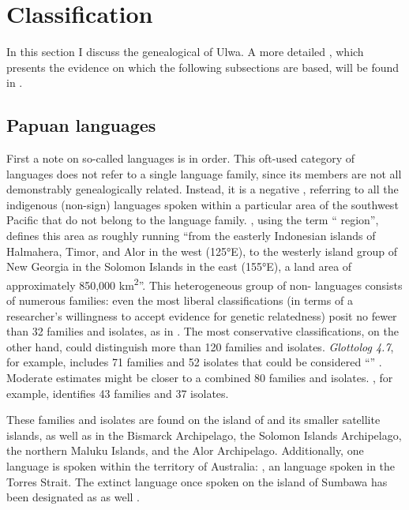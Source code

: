 
\section{Classification}\label{sec:1.7}


In this section I discuss the genealogical  of Ulwa. A more detailed , which presents the evidence on which the following subsections are based, will be found in \citet{UsherBarlow}.

\subsection{Papuan languages}\label{sec:1.7.1}

First a note on so-called  languages is in order. This oft-used category of languages does not refer to a single language family, since its members are not all demonstrably genealogically related. Instead, it is a negative , referring to all the indigenous (non-sign) languages spoken within a particular area of the southwest Pacific that do not belong to the  language family. \citet[357]{Foley2000}, using the term “ region”, defines this area as roughly running “from the easterly Indonesian islands of Halmahera, Timor, and Alor in the west (125°E), to the westerly island group of New Georgia in the Solomon Islands in the east (155°E), a land area of approximately 850,000 km\textsuperscript{2}”. This heterogeneous group of non- languages consists of numerous families: even the most liberal classifications (in terms of a researcher’s willingness to accept evidence for genetic relatedness) posit no fewer than 32  families and isolates, as in \citet[30]{Ross2005}. The most conservative classifications, on the other hand, could distinguish more than 120  families and isolates. \textit{Glottolog 4.7}, for example, includes 71 families and 52 isolates that could be considered “” \citep{HammarströmEtAl2022}. Moderate estimates might be closer to a combined 80 families and isolates. \citet{Palmer2018}, for example, identifies 43 families and 37 isolates.\largerpage

These families and isolates are found on the island of  and its smaller satellite islands, as well as in the Bismarck Archipelago, the Solomon Islands Archipelago, the northern Maluku Islands, and the Alor Archipelago. Additionally, one  language is spoken within the territory of Australia: , an  language spoken in the Torres Strait. The extinct language  once spoken on the island of Sumbawa has been designated as  as well \citep{Donohue2007}.


